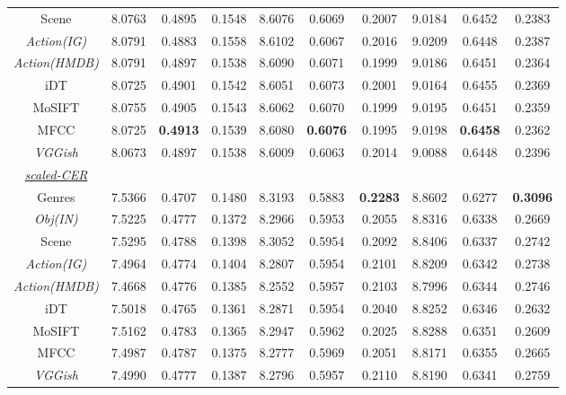 \documentclass[review]{elsarticle}
\begin{document}
\begin{table}[H]
\begin{adjustbox}{width=\columnwidth}
\begin{tabular}{|c|c c c c c c c c c|}
Scene 	&8.0763	&0.4895	&0.1548	&8.6076	&0.6069	&0.2007	&9.0184	&0.6452	&0.2383	\\
\textit{Action(IG)} 	&8.0791	&0.4883	&0.1558	&8.6102	&0.6067	&0.2016	&9.0209	&0.6448	&0.2387	\\ 
\textit{Action(HMDB)} 	&8.0791	&0.4897	&0.1538	&8.6090	&0.6071	&0.1999	&9.0186	&0.6451	&0.2364	\\ 
iDT 	&8.0725	&0.4901	&0.1542	&8.6051	&0.6073	&0.2001	&9.0164	&0.6455	&0.2369	\\ 
MoSIFT 	&8.0755	&0.4905	&0.1543	&8.6062	&0.6070	&0.1999	&9.0195	&0.6451	&0.2359	\\ 
MFCC	&8.0725	&\textbf{0.4913}	&0.1539	&8.6080	&\textbf{0.6076}	&0.1995	&9.0198	&\textbf{0.6458}	&0.2362	\\ 
\textit{VGGish} 	&8.0673	&0.4897	&0.1538	&8.6009	&0.6063	&0.2014	&9.0088	&0.6448	&0.2396	\\ 
\midrule
\underline{\textit{scaled-CER}} & & & & & & & & &\\
Genres 	&7.5366	&0.4707	&0.1480	&8.3193	&0.5883	&\textbf{0.2283}	&8.8602	&0.6277	&\textbf{0.3096}	\\ 
\textit{Obj(IN)} 	&7.5225	&0.4777	&0.1372	&8.2966	&0.5953	&0.2055	&8.8316	&0.6338	&0.2669	\\
Scene 	&7.5295	&0.4788	&0.1398	&8.3052	&0.5954	&0.2092	&8.8406	&0.6337	&0.2742	\\ 
\textit{Action(IG)}	&7.4964	&0.4774	&0.1404	&8.2807	&0.5954	&0.2101	&8.8209	&0.6342	&0.2738	\\ 
\textit{Action(HMDB)} 	&7.4668	&0.4776	&0.1385	&8.2552	&0.5957	&0.2103	&8.7996	&0.6344	&0.2746	\\ 
iDT	&7.5018	&0.4765	&0.1361	&8.2871	&0.5954	&0.2040	&8.8252	&0.6346	&0.2632	\\ 
MoSIFT 	&7.5162	&0.4783	&0.1365	&8.2947	&0.5962	&0.2025	&8.8288	&0.6351	&0.2609	\\ 
MFCC 	&7.4987	&0.4787	&0.1375	&8.2777	&0.5969	&0.2051	&8.8171	&0.6355	&0.2665	\\ 
\textit{VGGish} 	&7.4990	&0.4777	&0.1387	&8.2796	&0.5957	&0.2110	&8.8190	&0.6341	&0.2759	\\ \hline
    \end{tabular}
    \end{adjustbox}
\end{table}
\end{document}
